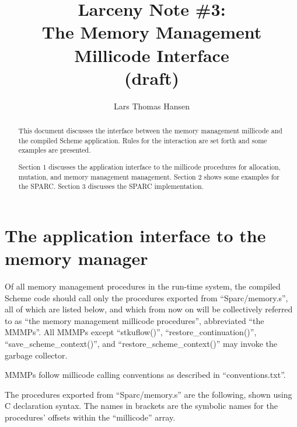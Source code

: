 


\title{Larceny Note \#3: \\
       The Memory Management Millicode Interface \\
       {\tenrm (draft)}}
\author{Lars Thomas Hansen}


\maketitle
\begin{abstract}
This document discusses the interface between the memory management
millicode and the compiled Scheme application. Rules for the
interaction are set forth and some examples are presented.

Section 1 discusses the application interface to the millicode
procedures for allocation, mutation, and memory management management.
Section 2 shows some examples for the SPARC. Section 3 discusses the
SPARC implementation.
\end{abstract}

\section{The application interface to the memory manager}

Of all memory management procedures in the run-time system, the
compiled Scheme code should call only the procedures exported from
``Sparc/memory.s'', all of which are listed below, and which from now on will
be collectively referred to as ``the memory management millicode
procedures'', abbreviated ``the MMMPs''. All MMMPs except ``stkuflow()'',
``restore\_continuation()'', ``save\_scheme\_context()'', and
``restore\_scheme\_context()'' may invoke the garbage collector.

MMMPs follow millicode calling conventions as described in
``conventions.txt''.

The procedures exported from ``Sparc/memory.s'' are the following,
shown using C declaration syntax. The names in brackets are the
symbolic names for the procedures' offsets within the ``millicode''
array.

